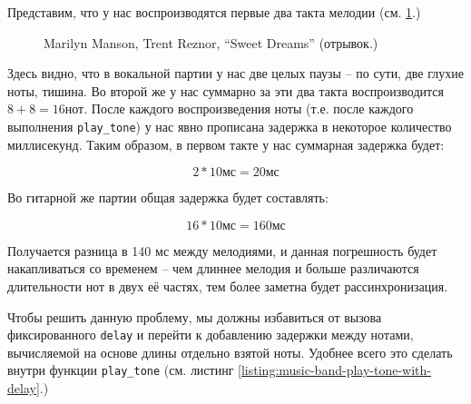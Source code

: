 \documentclass[../sparc.tex]{subfiles}
\begin{document}
Представим, что у нас воспроизводятся первые два такта мелодии
(см. \ref{fig:lilypond-melody-sweet-dreams-part}.)

\begin{figure}[!h]
  \caption{Marilyn Manson, Trent Reznor, ``Sweet Dreams'' (отрывок.)}
  \label{fig:lilypond-melody-sweet-dreams-part}
\end{figure}

Здесь видно, что в вокальной партии у нас две целых паузы -- по сути, две глухие
ноты, тишина.  Во второй же у нас суммарно за эти два такта воспроизводится $8 +
8 = 16 \mbox{нот}$.  После каждого воспроизведения ноты (т.е. после каждого
выполнения \texttt{play\_tone}) у нас явно прописана задержка в некоторое
количество миллисекунд.  Таким образом, в первом такте у нас суммарная задержка
будет:

\begin{equation}
  2 * 10 \mbox{мс} = 20 \mbox{мс}
\end{equation}

Во гитарной же партии общая задержка будет составлять:

\begin{equation}
  16 * 10 \mbox{мс} = 160 \mbox{мс}
\end{equation}

Получается разница в 140 мс между мелодиями, и данная погрешность будет
накапливаться со временем -- чем длиннее мелодия и больше различаются
длительности нот в двух её частях, тем более заметна будет рассинхронизация.

Чтобы решить данную проблему, мы должны избавиться от вызова фиксированного
\texttt{delay} и перейти к добавлению задержки между нотами, вычисляемой на
основе длины отдельно взятой ноты.  Удобнее всего это сделать внутри функции
\texttt{play\_tone} (см. листинг \ref{listing:music-band-play-tone-with-delay}.)
\end{document}
